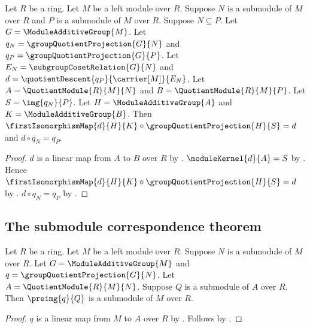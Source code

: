 \begin{theorem}\label{module_third_isomorphism_factorization}
    Let $R$ be a ring.
    Let $M$ be a left module over $R$.
    Suppose $N$ is a submodule of $M$ over $R$ and
        $P$ is a submodule of $M$ over $R$.
    Suppose $N\subseteq P$.
    Let $G=\ModuleAdditiveGroup{M}$.
    Let $q_N=\groupQuotientProjection{G}{N}$ and
        $q_P=\groupQuotientProjection{G}{P}$.
    Let $E_N=\subgroupCosetRelation{G}{N}$ and
        $d=\quotientDescent{q_P}{\carrier[M]}{E_N}$.
    Let $A=\QuotientModule{R}{M}{N}$ and
        $B=\QuotientModule{R}{M}{P}$.
    Let $S=\img{q_N}{P}$.
    Let $H=\ModuleAdditiveGroup{A}$ and
        $K=\ModuleAdditiveGroup{B}$.
    Then
        $\firstIsomorphismMap{d}{H}{K}\circ
            \groupQuotientProjection{H}{S}=d$ and
        $d\circ q_N=q_P$.
\end{theorem}
\begin{proof}
    $d$ is a linear map from $A$ to $B$ over $R$ by
        .
    $\moduleKernel{d}{A}=S$ by
        .
    Hence
        $\firstIsomorphismMap{d}{H}{K}\circ
            \groupQuotientProjection{H}{S}=d$ by
        .
    $d\circ q_N=q_P$ by
        .
\end{proof}

\subsection{The submodule correspondence theorem}

\begin{theorem}\label{module_quotient_correspondence_preimage_submodule}
    Let $R$ be a ring.
    Let $M$ be a left module over $R$.
    Suppose $N$ is a submodule of $M$ over $R$.
    Let $G=\ModuleAdditiveGroup{M}$ and
        $q=\groupQuotientProjection{G}{N}$.
    Let $A=\QuotientModule{R}{M}{N}$.
    Suppose $Q$ is a submodule of $A$ over $R$.
    Then $\preimg{q}{Q}$ is a submodule of $M$ over $R$.
\end{theorem}
\begin{proof}
    $q$ is a linear map from $M$ to $A$ over $R$ by
        .
    Follows by .
\end{proof}

